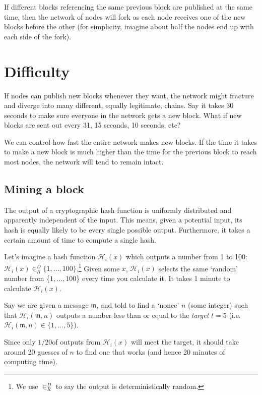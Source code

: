 If different blocks referencing the same previous block are published at the same time, then the network of nodes will fork as each node receives one of the new blocks before the other (for simplicity, imagine about half the nodes end up with each side of the fork).



\section{Difficulty}
\label{sec:difficulty}

If nodes can publish new blocks whenever they want, the network might fracture and diverge into many different, equally legitimate, chains. Say it takes 30 seconds to make sure everyone in the network gets a new block. What if new blocks are sent out every 31, 15 seconds, 10 seconds, etc?

We can control how fast the entire network makes new blocks. If the time it takes to make a new block is much higher than the time for the previous block to reach most nodes, the network will tend to remain intact.


\subsection{Mining a block}

The output of a cryptographic hash function is uniformly distributed and apparently independent of the input. This means, given a potential input, its hash is equally likely to be every single possible output. Furthermore, it takes a certain amount of time to compute a single hash.

Let's imagine a hash function $\mathcal{H}_i(x)$ which outputs a number from 1 to 100: $\mathcal{H}_i(x) \in^D_R \{1,...,100\}$.\footnote{We use $\in^D_R$ to say the output is deterministically random.} Given some $x$, $\mathcal{H}_i(x)$ selects the same `random' number from \{$1,...,100$\} every time you calculate it. It takes 1 minute to calculate $\mathcal{H}_i(x)$.

Say we are given a message $\mathfrak{m}$, and told to find a `nonce' $n$ (some integer) such that $\mathcal{H}_i(\mathfrak{m},n)$ outputs a number less than or equal to the {\em target} $t = 5$ (i.e. $\mathcal{H}_i(\mathfrak{m},n) \in \{1,...,5\}$).

Since only $1/20$\nth of outputs from $\mathcal{H}_i(x)$ will meet the target, it should take around 20 guesses of $n$ to find one that works (and hence 20 minutes of computing time).

